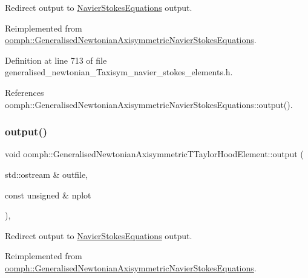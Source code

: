 Redirect output to \hyperlink{classoomph_1_1NavierStokesEquations}{Navier\+Stokes\+Equations} output. 



Reimplemented from \hyperlink{classoomph_1_1GeneralisedNewtonianAxisymmetricNavierStokesEquations_a25e906f89c3cec75081bd2fc88b37fd5}{oomph\+::\+Generalised\+Newtonian\+Axisymmetric\+Navier\+Stokes\+Equations}.



Definition at line 713 of file generalised\+\_\+newtonian\+\_\+\+Taxisym\+\_\+navier\+\_\+stokes\+\_\+elements.\+h.



References oomph\+::\+Generalised\+Newtonian\+Axisymmetric\+Navier\+Stokes\+Equations\+::output().

\mbox{\label{classoomph_1_1GeneralisedNewtonianAxisymmetricTTaylorHoodElement_a9dbf98876164e1a9443a01fb3b0d284b}} 
\subsubsection{\texorpdfstring{output()}{output()}\hspace{0.1cm}{\footnotesize\ttfamily [2/4]}}
{\footnotesize\ttfamily void oomph\+::\+Generalised\+Newtonian\+Axisymmetric\+T\+Taylor\+Hood\+Element\+::output (\begin{DoxyParamCaption}\item[{std\+::ostream \&}]{outfile,  }\item[{const unsigned \&}]{nplot }\end{DoxyParamCaption})\hspace{0.3cm}{\ttfamily [inline]}, {\ttfamily [virtual]}}



Redirect output to \hyperlink{classoomph_1_1NavierStokesEquations}{Navier\+Stokes\+Equations} output. 



Reimplemented from \hyperlink{classoomph_1_1GeneralisedNewtonianAxisymmetricNavierStokesEquations_a7c80af0c22f64c3484cdeac1edcbe28c}{oomph\+::\+Generalised\+Newtonian\+Axisymmetric\+Navier\+Stokes\+Equations}.



